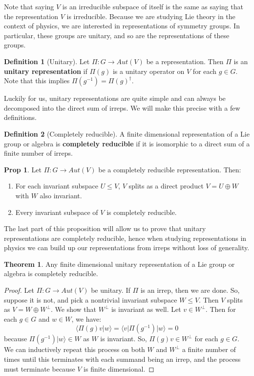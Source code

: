 \documentclass[11pt, oneside]{article}   	%
\theoremstyle{definition}
\newtheorem{definition}{Definition}[section]
\newtheorem{theorem}{Theorem}[section]
\newtheorem{prop}{Prop}[section]
\begin{document}
Note that saying $V$ is an irreducible subspace of itself is the same as saying that the representation $V$ 
is irreducible. Because we are studying Lie theory in the context of physics, we are interested in representations of 
symmetry groups. In particular, these groups are unitary, and so are the representations of these groups.
\begin{definition}[Unitary]
	Let $\Pi : G\rightarrow Aut(V)$ be a representation. Then $\Pi$ is an \textbf{unitary representation} if $\Pi(g)$ 
	is a unitary operator on $V$ for each $g\in G$. Note that this implies $\Pi(g^{-1}) = \Pi(g)^\dagger$. 
\end{definition}

Luckily for us, unitary representations are quite simple and can always be decomposed into the direct sum of irreps. 
We will make this precise with a few definitions.

\begin{definition}[Completely reducible]
	A finite dimensional representation of a Lie group or algebra is \textbf{completely reducible} if it is isomorphic 
	to a direct sum of a finite number of irreps. 
\end{definition}

\begin{prop}
	Let $\Pi : G\rightarrow Aut(V)$ be a completely reducible representation. Then:
	\begin{enumerate}
		\item For each invariant subspace $U\leq V$, $V$ splits as a direct product $V = U\oplus W$ with 
		$W$ also invariant. 
		\item Every invariant subspace of $V$ is completely reducible.
	\end{enumerate}
\end{prop}

The last part of this proposition will allow us to prove that unitary representations are completely reducible, hence 
when studying representations in physics we can build up our representations from irreps without loss of generality.

\begin{theorem}
	Any finite dimensional unitary representation of a Lie group or algebra is completely reducible.
\end{theorem}

\begin{proof}
	Let $\Pi : G\rightarrow Aut(V)$ be unitary. If $\Pi$ is an irrep, then we are done. So, suppose it is not, and pick 
	a nontrivial invariant subspace $W\leq V$. Then $V$ splits as $V = W\oplus W^\perp$. We show that $W^\perp$ 
	is invariant as well. Let $v\in W^\perp$. Then for each $g\in G$ and $w\in W$, we have:
	\begin{equation}
		\langle \Pi(g)v|w\rangle = \langle v | \Pi(g^{-1}) |w\rangle = 0
	\end{equation}
	because $\Pi(g^{-1})|w\rangle\in W$ as $W$ is invariant. So, $\Pi(g)v\in W^\perp$ for each $g\in G$. We 
	can inductively repeat this process on both $W$ and $W^\perp$ a finite number of times until this terminates 
	with each summand being an irrep, and the process must terminate because $V$ is finite dimensional. 
\end{proof}
\end{document}
